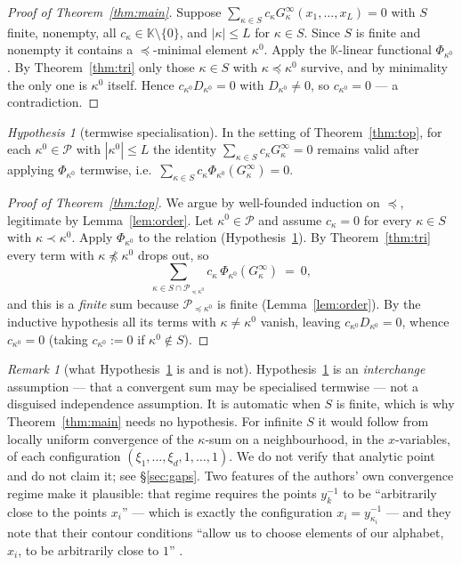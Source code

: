 \documentclass[11pt]{article}
\theoremstyle{definition}
\theoremstyle{remark}
\newtheorem{rem}[thm]{Remark}
\newtheorem{hyp}[thm]{Hypothesis}
\newcommand{\KK}{\mathbb{K}}
\newcommand{\PP}{\mathcal{P}}
\newcommand{\Gi}[1]{G^{\infty}_{#1}}
\begin{document}
\begin{proof}[Proof of Theorem~\ref{thm:main}]
Suppose $\sum_{\kappa\in S}c_\kappa\Gi{\kappa}(x_1,\dots,x_L)=0$ with $S$ finite, nonempty, all
$c_\kappa\in\KK\setminus\{0\}$, and $|\kappa|\le L$ for $\kappa\in S$. Since $S$ is finite and
nonempty it contains a $\preceq$-minimal element $\kappa^0$. Apply the $\KK$-linear functional
$\Phi_{\kappa^0}$. By Theorem~\ref{thm:tri} only those $\kappa\in S$ with
$\kappa\preceq\kappa^0$ survive, and by minimality the only one is $\kappa^0$ itself. Hence
$c_{\kappa^0}D_{\kappa^0}=0$ with $D_{\kappa^0}\ne0$, so $c_{\kappa^0}=0$ --- a contradiction.
\end{proof}

\begin{hyp}[termwise specialisation]\label{hyp:H}
In the setting of Theorem~\ref{thm:top}, for each $\kappa^0\in\PP$ with $|\kappa^0|\le L$ the
identity $\sum_{\kappa\in S}c_\kappa\Gi\kappa=0$ remains valid after applying
$\Phi_{\kappa^0}$ termwise, i.e.\ $\sum_{\kappa\in S}c_\kappa\Phi_{\kappa^0}(\Gi\kappa)=0$.
\end{hyp}

\begin{proof}[Proof of Theorem~\ref{thm:top}]
We argue by well-founded induction on $\preceq$, legitimate by Lemma~\ref{lem:order}. Let
$\kappa^0\in\PP$ and assume $c_\kappa=0$ for every $\kappa\in S$ with $\kappa\prec\kappa^0$.
Apply $\Phi_{\kappa^0}$ to the relation (Hypothesis~\ref{hyp:H}). By Theorem~\ref{thm:tri}
every term with $\kappa\not\preceq\kappa^0$ drops out, so
\[
  \sum_{\kappa\in S\cap\PP_{\preceq\kappa^0}}c_\kappa\,\Phi_{\kappa^0}(\Gi\kappa)\ =\ 0 ,
\]
and this is a \emph{finite} sum because $\PP_{\preceq\kappa^0}$ is finite
(Lemma~\ref{lem:order}). By the inductive hypothesis all its terms with $\kappa\ne\kappa^0$
vanish, leaving $c_{\kappa^0}D_{\kappa^0}=0$, whence $c_{\kappa^0}=0$ (taking $c_{\kappa^0}:=0$
if $\kappa^0\notin S$).
\end{proof}

\begin{rem}[what Hypothesis~\ref{hyp:H} is and is not]\label{rem:H}
Hypothesis~\ref{hyp:H} is an \emph{interchange} assumption --- that a convergent sum may be
specialised termwise --- not a disguised independence assumption. It is automatic when $S$ is
finite, which is why Theorem~\ref{thm:main} needs no hypothesis. For infinite $S$ it would
follow from locally uniform convergence of the $\kappa$-sum on a neighbourhood, in the
$x$-variables, of each configuration $(\xi_1,\dots,\xi_d,1,\dots,1)$. We do not verify that
analytic point and do not claim it; see \S\ref{sec:gaps}. Two features of the authors' own
convergence regime make it plausible: that regime requires the points $y_k^{-1}$ to be
``arbitrarily close to the points $x_i$'' \cite[line 3869]{GDMW} --- which is exactly the
configuration $x_i=y_{\kappa_i}^{-1}$ --- and they note that their contour conditions
``allow us to choose elements of our alphabet, $x_i$, to be arbitrarily close to $1$''
\cite[line 3737]{GDMW}.
\end{rem}
\end{document}
